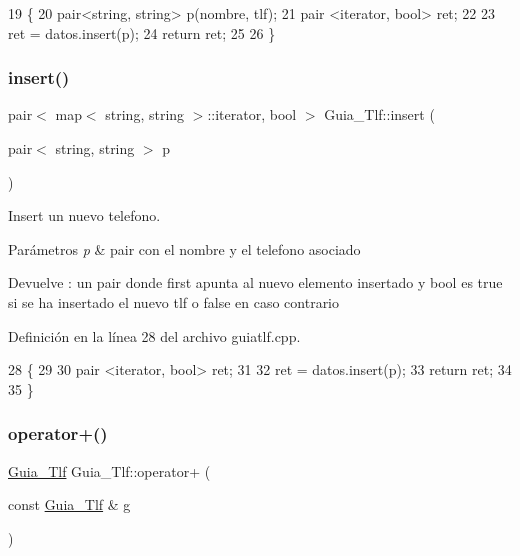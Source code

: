 \begin{DoxyCode}
19                                                                                   \{
20     pair<string, string> p(nombre, tlf);
21     pair <iterator, bool> ret;
22 
23     ret = datos.insert(p);
24     \textcolor{keywordflow}{return} ret;
25 
26 \}
\end{DoxyCode}
\mbox{\label{classGuia__Tlf_a4c4e4cc9540896434edd915296e56c87}} 
\subsubsection{\texorpdfstring{insert()}{insert()}\hspace{0.1cm}{\footnotesize\ttfamily [2/2]}}
{\footnotesize\ttfamily pair$<$ map$<$ string, string $>$\+::iterator, bool $>$ Guia\+\_\+\+Tlf\+::insert (\begin{DoxyParamCaption}\item[{pair$<$ string, string $>$}]{p }\end{DoxyParamCaption})}



Insert un nuevo telefono. 


\begin{DoxyParams}{Parámetros}
{\em p} & pair con el nombre y el telefono asociado\\
\hline
\end{DoxyParams}
\begin{DoxyReturn}{Devuelve}
\+: un pair donde first apunta al nuevo elemento insertado y bool es true si se ha insertado el nuevo tlf o false en caso contrario 
\end{DoxyReturn}


Definición en la línea 28 del archivo guiatlf.\+cpp.


\begin{DoxyCode}
28                                                                                \{
29 
30     pair <iterator, bool> ret;
31 
32     ret = datos.insert(p);
33     \textcolor{keywordflow}{return} ret;
34 
35 \}
\end{DoxyCode}
\mbox{\label{classGuia__Tlf_a3e0b08a1985d3c72853690730319172f}} 
\subsubsection{\texorpdfstring{operator+()}{operator+()}}
{\footnotesize\ttfamily \hyperlink{classGuia__Tlf}{Guia\+\_\+\+Tlf} Guia\+\_\+\+Tlf\+::operator+ (\begin{DoxyParamCaption}\item[{const \hyperlink{classGuia__Tlf}{Guia\+\_\+\+Tlf} \&}]{g }\end{DoxyParamCaption})}



